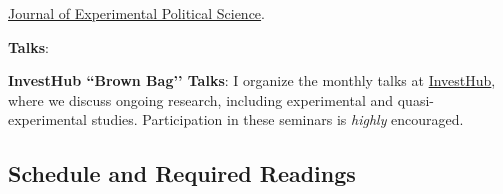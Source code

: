\documentclass[letterpaper]{article}\usepackage[]{graphicx}\usepackage[svgnames]{xcolor}
\renewenvironment{itemize}{
  \begin{list}{}{
    \setlength{\leftmargin}{1.5em}
  }
}{
  \end{list}
}
\begin{document}
\begin{itemize}
\begin{itemize}
    \item[$\diamond$] \href{https://www.cambridge.org/core/journals/journal-of-experimental-political-science}{Journal of Experimental Political Science}.

    \end{itemize} 


\item {\bf Talks}:

  \begin{itemize}
    \item[$\diamond$] {\bf InvestHub ``Brown Bag’’ Talks}: I organize the monthly talks at \href{https://invest.utu.fi/welfare-research-and-ecosystem/investhub/}{InvestHub}, where we discuss ongoing research, including experimental and quasi-experimental studies. Participation in these seminars is \emph{highly} encouraged.
  \end{itemize}

\end{itemize}


\subsection*{Schedule and Required Readings}
\end{document}
